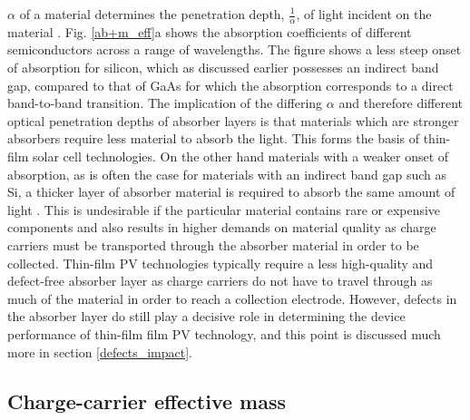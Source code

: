 \documentclass[11pt, twoside]{report}
\begin{document}
$\alpha$ of a material determines the penetration depth, $\frac{1}{\alpha}$, of light incident on the material \cite{absorption_coeff_book1}. Fig. \ref{ab+m_eff}a shows the absorption coefficients of different semiconductors across a range of wavelengths. The figure shows a less steep onset of absorption for silicon, which as discussed earlier possesses an indirect band gap, compared to that of GaAs for which the absorption corresponds to a direct band-to-band transition. 
The implication of the differing $\alpha$ and therefore different optical penetration depths of absorber layers is that materials which are stronger absorbers require less material to absorb the light. This forms the basis of thin-film solar cell technologies.
On the other hand materials with a weaker onset of absorption, as is often the case for materials with an indirect band gap such as Si, a thicker layer of absorber material is required to absorb the same amount of light \cite{PV_bands_book}. This is undesirable if the particular material contains rare or expensive components and also results in higher demands on material quality as charge carriers must be transported through the absorber material in order to be collected.
Thin-film PV technologies typically require a less high-quality and defect-free absorber layer as charge carriers do not have to travel through as much of the material in order to reach a collection electrode. However, defects in the absorber layer do still play a decisive role in determining the device performance of thin-film film PV technology, and this point is discussed much more in section \ref{defects_impact}.

\subsection{Charge-carrier effective mass}
\end{document}
